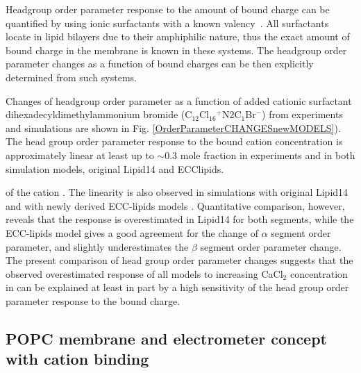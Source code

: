 \documentclass[aip,jcp,twocolumn]{revtex4}
\begin{document}
Headgroup order parameter response to the amount of bound charge can
be quantified by using ionic surfactants with a known valency~\cite{scherer89}.
All surfactants locate in lipid bilayers due to their amphiphilic nature,
thus the exact amount of bound charge in the membrane is known in these systems.
The headgroup order parameter changes as a function of bound charges can be then
explicitly determined from such systems.

Changes of headgroup order parameter as a function of added cationic surfactant
dihexadecyldimethylammonium bromide (C$_{12}$Cl$_{16}$$^+$N2C$_1$Br$^-$) from
experiments~\cite{scherer89} and simulations are shown in
Fig. \ref{OrderParameterCHANGESnewMODELS}).
The head group order parameter response to the bound cation concentration
is approximately linear at least up to $\sim$0.3 mole fraction in experiments and
in both simulation models, original Lipid14 and ECClipids. 

of the cation \cite{scherer89}.
The linearity is also observed in simulations with original Lipid14 and with
newly derived ECC-lipids models .
Quantitative comparison, however, reveals that the response is overestimated in 
Lipid14 for both segments, while the ECC-lipids model gives a
good agreement for the change of $\alpha$ segment order parameter, and slightly
underestimates the $\beta$ segment order parameter change.
The present comparison of head group order parameter changes 
suggests that the observed overestimated response of all models to 
increasing CaCl$_2$ concentration in \cite{catte16} 
can be explained at least in part by a high sensitivity of the head group order parameter response
to the bound charge.






\subsection{POPC membrane and electrometer concept with cation binding}
\end{document}
